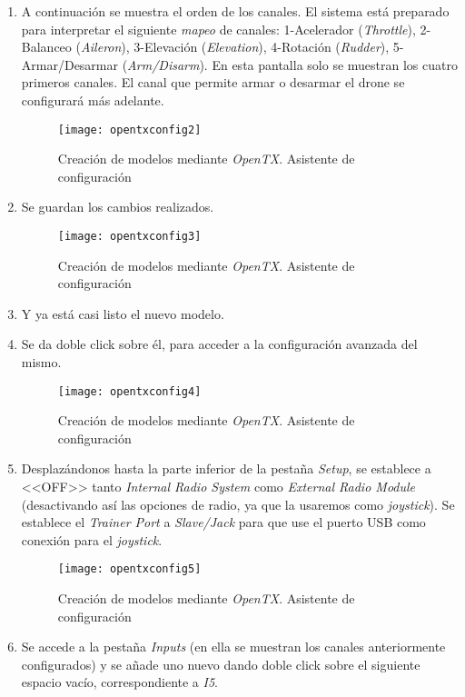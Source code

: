 \begin{enumerate}
\item A continuación se muestra el orden de los canales. El sistema está preparado para interpretar el siguiente \emph{mapeo} de canales: 1-Acelerador (\emph{Throttle}), 2-Balanceo (\emph{Aileron}), 3-Elevación (\emph{Elevation}), 4-Rotación (\emph{Rudder}), 5-Armar/Desarmar (\emph{Arm/Disarm}).
En esta pantalla solo se muestran los cuatro primeros canales. El canal que permite armar o desarmar el drone se configurará más adelante.
\begin{figure}[H]
	\centering
	\texttt{[image: opentxconfig2]}
	\caption[Creación de modelos OpenTX. 2]{Creación de modelos mediante \emph{OpenTX}. Asistente de configuración}\label{fig:opentxconfig2}
\end{figure}
\item Se guardan los cambios realizados.
\begin{figure}[H]
	\centering
	\texttt{[image: opentxconfig3]}
	\caption[Creación de modelos OpenTX. 3]{Creación de modelos mediante \emph{OpenTX}. Asistente de configuración}\label{fig:opentxconfig3}
\end{figure}
\item Y ya está casi listo el nuevo modelo. 
\item Se da doble click sobre él, para acceder a la configuración avanzada del mismo.
\begin{figure}[H]
	\centering
	\texttt{[image: opentxconfig4]}
	\caption[Creación de modelos OpenTX. 4]{Creación de modelos mediante \emph{OpenTX}. Asistente de configuración}\label{fig:opentxconfig4}
\end{figure}
\item Desplazándonos hasta la parte inferior de la pestaña \emph{Setup}, se establece a <<OFF>> tanto \emph{Internal Radio System} como \emph{External Radio Module} (desactivando así las opciones de radio, ya que la usaremos como \emph{joystick}). Se establece el \emph{Trainer Port} a \emph{Slave/Jack} para que use el puerto USB como conexión para el \emph{joystick}.
\begin{figure}[H]
	\centering
	\texttt{[image: opentxconfig5]}
	\caption[Creación de modelos OpenTX. 5]{Creación de modelos mediante \emph{OpenTX}. Asistente de configuración}\label{fig:opentxconfig5}
\end{figure}
\item Se accede a la pestaña \emph{Inputs} (en ella se muestran los canales anteriormente configurados) y se añade uno nuevo dando doble click sobre el siguiente espacio vacío, correspondiente a \emph{I5}. 

\end{enumerate}
